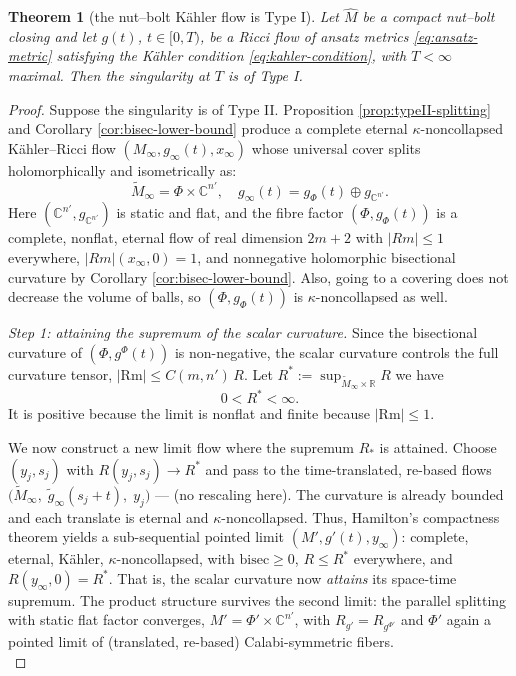 \documentclass[11pt]{amsart}
\theoremstyle{plain}
\numberwithin{equation}{section}
\newtheorem{theorem}{Theorem}[section]
\theoremstyle{definition}
\theoremstyle{remark}
\begin{document}
\begin{theorem}[the nut--bolt Kähler flow is Type I]\label{thm:nut-bolt-typeI}
	Let $\widehat{M}$ be a compact nut--bolt closing and let $g (t)$, $t \in [ 0, T )$, be a Ricci flow of ansatz metrics \eqref{eq:ansatz-metric} satisfying the Kähler condition \eqref{eq:kahler-condition}, with $T < \infty$ maximal. Then the singularity at $T$ is of Type I.
	
\end{theorem}

\begin{proof}
	Suppose the singularity is of Type II. Proposition \ref{prop:typeII-splitting} and Corollary \ref{cor:bisec-lower-bound} produce a complete eternal $\kappa$-noncollapsed Kähler--Ricci flow  $(M_\infty, g_\infty(t), x_\infty)$ whose universal cover splits holomorphically and isometrically as: 
	$$\widetilde{M}_\infty = \Phi \times \mathbb{C}^{n'}, \quad g_\infty(t) = g_\Phi(t) \oplus g_{\mathbb{C}^{n'}}.$$
		Here $(\mathbb{C}^{n'}, g_{\mathbb{C}^{n'}})$ is static and flat, and the fibre factor $(\Phi, g_\Phi(t))$ is a complete, nonflat, eternal flow of real dimension $2m+2$ with $|Rm| \le 1$ everywhere, $|Rm|(x_\infty, 0) = 1$, and nonnegative holomorphic bisectional curvature by Corollary \ref{cor:bisec-lower-bound}. Also, going to a covering does not decrease the volume of balls, so  $(\Phi, g_\Phi(t))$  is $\kappa$-noncollapsed as well. %
	
	\emph{Step 1: attaining the supremum of the scalar curvature.} Since the bisectional curvature of $( \Phi, g^\Phi (t) )$ is non-negative, the scalar curvature controls the full curvature tensor, $| \mathrm{Rm} | \leq C ( m, n' )\, R$. Let $R^* := \sup_{\widetilde{M}_\infty \times \mathbb{R}} R$ we have \[0 < R^* < \infty.\]
	It is positive because the limit is nonflat and finite because $| \mathrm{Rm} | \leq 1$. 
	
	We now construct a new limit flow where the supremum $R_*$ is attained. Choose $( y_j, s_j )$ with $R ( y_j, s_j ) \to R^*$ and pass to the time-translated, re-based flows $\big( \widetilde{M}_\infty, \; \widetilde{g}_\infty ( s_j + t ), \; y_j \big)$ --- (no rescaling here). The curvature is already bounded and each translate is eternal and $\kappa$-noncollapsed. Thus, Hamilton's compactness theorem yields a sub-sequential pointed limit $( M', g' (t), y_\infty )$: complete, eternal, Kähler, $\kappa$-noncollapsed, with $\mathrm{bisec} \geq 0$, $R \leq R^*$ everywhere, and $R ( y_\infty, 0 ) = R^*$. That is, the scalar curvature now \emph{attains} its space-time supremum. The product structure survives the second limit: the parallel splitting with static flat factor converges, $M' = \Phi' \times \mathbb{C}^{n'}$, with $R_{g'} = R_{g^{\Phi'}}$ and $\Phi'$ again a pointed limit of (translated, re-based) Calabi-symmetric fibers.\\
	

\end{proof}
\end{document}
